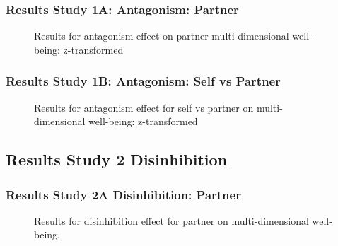 \documentclass[
  singlecolumn]{article}
\begin{document}
\subsubsection{Results Study 1A: Antagonism:
Partner}\label{results-study-1a-antagonism-partner}

\begin{figure}


\caption{\label{fig-results-antagonism-partner}Results for antagonism
effect on partner multi-dimensional well-being: z-transformed}

\end{figure}%

\newpage{}

\subsubsection{Results Study 1B: Antagonism: Self vs
Partner}\label{results-study-1b-antagonism-self-vs-partner}

\begin{figure}


\caption{\label{fig-results-antagonism-self}Results for antagonism
effect for self vs partner on multi-dimensional well-being:
z-transformed}

\end{figure}%

\newpage{}

\newpage{}

\subsection{Results Study 2
Disinhibition}\label{results-study-2-disinhibition}

\subsubsection{Results Study 2A Disinhibition:
Partner}\label{results-study-2a-disinhibition-partner}

\begin{figure}


\caption{\label{fig-results-disinhibition-partner}Results for
disinhibition effect for partner on multi-dimensional well-being.}

\end{figure}%
\end{document}
